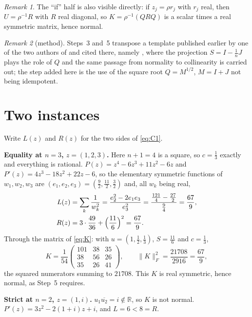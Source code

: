 \documentclass[11pt]{amsart}
\theoremstyle{remark}
\newtheorem*{remark}{Remark}
\newcommand{\RR}{\mathbb{R}}
\newcommand{\Frob}[1]{\lVert #1\rVert_F}
\begin{document}
\begin{remark}
The ``if'' half is also visible directly: if $z_j=\rho r_j$ with $r_j$ real,
then $U=\rho^{-1}R$ with $R$ real diagonal, so $K=\rho^{-1}(QRQ)$ is a scalar
times a real symmetric matrix, hence normal.
\end{remark}

\begin{remark}[method]
Steps~3 and~5 transpose a template published earlier by one of the two authors
of \cite{TZ} and cited there, namely \cite{Tang25}, where the projection
$S=I-\tfrac1nJ$ plays the role of $Q$ and the same passage from normality to
collinearity is carried out; the step added here is the use of the square root
$Q=M^{1/2}$, $M=I+J$ not being idempotent.
\end{remark}

\section{Two instances}

Write $L(z)$ and $R(z)$ for the two sides of \eqref{eq:C1}.

\medskip
\noindent\textbf{Equality at $n=3$, $z=(1,2,3)$.}
Here $n+1=4$ is a square, so $c=\tfrac13$ exactly and everything is rational.
$P(z)=z^{4}-6z^{3}+11z^{2}-6z$ and $P'(z)=4z^{3}-18z^{2}+22z-6$, so the
elementary symmetric functions of $w_1,w_2,w_3$ are
$(e_1,e_2,e_3)=(\tfrac92,\tfrac{11}2,\tfrac32)$ and, all $w_k$ being real,
\begin{align*}
  L(z)&=\sum_k\frac{1}{w_k^{2}}
      =\frac{e_2^{2}-2e_1e_3}{e_3^{2}}
      =\frac{\tfrac{121}{4}-\tfrac{27}{2}}{\tfrac94}
      =\frac{67}{9},\\
  R(z)&=3\cdot\frac{49}{36}+\Bigl(\frac{11}{6}\Bigr)^{2}=\frac{67}{9}.
\end{align*}
Through the matrix of \eqref{eq:K}: with $u=(1,\tfrac12,\tfrac13)$,
$S=\tfrac{11}6$ and $c=\tfrac13$,
\[
  K=\frac{1}{54}
  \begin{pmatrix}
    101 & 38 & 35\\
     38 & 56 & 26\\
     35 & 26 & 41
  \end{pmatrix},
  \qquad
  \Frob{K}^{2}=\frac{21708}{2916}=\frac{67}{9},
\]
the squared numerators summing to $21708$. This $K$ is real symmetric, hence
normal, as Step~5 requires.

\medskip
\noindent\textbf{Strict at $n=2$, $z=(1,i)$.}
$u_1\overline{u_2}=i\notin\RR$, so $K$ is not normal. $P'(z)=3z^{2}-2(1+i)z+i$,
and $L=6<8=R$.
\end{document}
